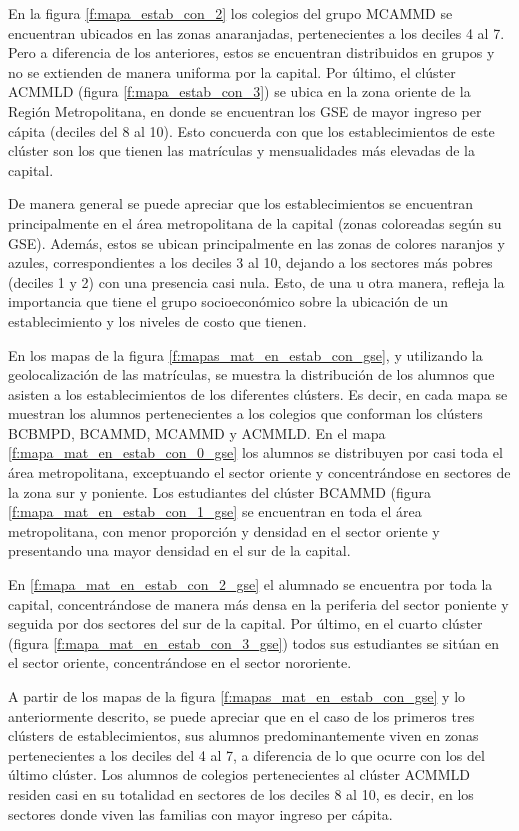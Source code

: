 \newpage
En la figura \ref{f:mapa_estab_con_2} los colegios del grupo MCAMMD se encuentran ubicados en las zonas anaranjadas, pertenecientes a los deciles 4 al 7. Pero a diferencia de los anteriores, estos se encuentran distribuidos en grupos y no se extienden de manera uniforma por la capital. Por último, el clúster ACMMLD (figura \ref{f:mapa_estab_con_3}) se ubica en la zona oriente de la Región Metropolitana, en donde se encuentran los GSE de mayor ingreso per cápita (deciles del 8 al 10). Esto concuerda con que los establecimientos de este clúster son los que tienen las matrículas y mensualidades más elevadas de la capital.

De manera general se puede apreciar que los establecimientos se encuentran principalmente en el área metropolitana de la capital (zonas coloreadas según su GSE). Además, estos se ubican principalmente en las zonas de colores naranjos y azules, correspondientes a los deciles 3 al 10, dejando a los sectores más pobres (deciles 1 y 2) con una presencia casi nula. Esto, de una u otra manera, refleja la importancia que tiene el grupo socioeconómico sobre la ubicación de un establecimiento y los niveles de costo que tienen.

En los mapas de la figura \ref{f:mapas_mat_en_estab_con_gse}, y utilizando la geolocalización de las matrículas, se muestra la distribución de los alumnos que asisten a los establecimientos de los diferentes clústers. Es decir, en cada mapa se muestran los alumnos pertenecientes a los colegios que conforman los clústers BCBMPD, BCAMMD, MCAMMD y ACMMLD. En el mapa \ref{f:mapa_mat_en_estab_con_0_gse} los alumnos se distribuyen por casi toda el área metropolitana, exceptuando el sector oriente y concentrándose en sectores de la zona sur y poniente. Los estudiantes del clúster BCAMMD (figura \ref{f:mapa_mat_en_estab_con_1_gse} se encuentran en toda el área metropolitana, con menor proporción y densidad en el sector oriente y presentando una mayor densidad en el sur de la capital.

En \ref{f:mapa_mat_en_estab_con_2_gse} el alumnado se encuentra por toda la capital, concentrándose de manera más densa en la periferia del sector poniente y seguida por dos sectores del sur de la capital. Por último, en el cuarto clúster (figura \ref{f:mapa_mat_en_estab_con_3_gse}) todos sus estudiantes se sitúan en el sector oriente, concentrándose en el sector nororiente.

A partir de los mapas de la figura \ref{f:mapas_mat_en_estab_con_gse} y lo anteriormente descrito, se puede apreciar que en el caso de los primeros tres clústers de establecimientos, sus alumnos predominantemente viven en zonas pertenecientes a los deciles del 4 al 7, a diferencia de lo que ocurre con los del último clúster. Los alumnos de colegios pertenecientes al clúster ACMMLD residen casi en su totalidad en sectores de los deciles 8 al 10, es decir, en los sectores donde viven las familias con mayor ingreso per cápita.

